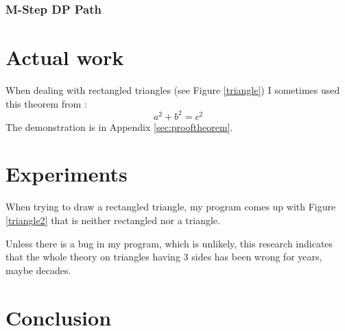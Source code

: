 \documentclass{report}
\begin{document}
 \subsection{M-Step DP Path}
 
 \chapter{Actual work}
  
 
 When dealing with rectangled triangles (see Figure \ref{triangle}) I sometimes used this theorem from \cite{pythm001}:
 \begin{equation}\label{theo}
  a^2 + b^2 = c^2
 \end{equation}The demonstration is in Appendix \ref{sec:prooftheorem}.
 
 
 \chapter{Experiments}
 
 When trying to draw a rectangled triangle, my program comes up with Figure \ref{triangle2} that is neither rectangled nor a triangle.
 
Unless there is a bug in my program, which is unlikely, this research indicates that the whole theory on triangles having 3 sides has been wrong for years, maybe decades.
 
 
 \chapter*{Conclusion}
 
% 
% 
 
 
 
 
 
 \cite{DBLP:journals/corr/abs-1803-04868}
 \cite{inbook}
 \cite{583794}
 \cite{article}
 \cite{article5}
 \cite{7313361}
 \cite{article7}
 \cite{6f42273b120f421fa980c61913dcd489}
 \cite{4082128}
 \cite{article10}
 \cite{10.2307/2984875}
 \cite{DBLP:journals/corr/abs-1807-08048}
 
 
 
\end{document}
